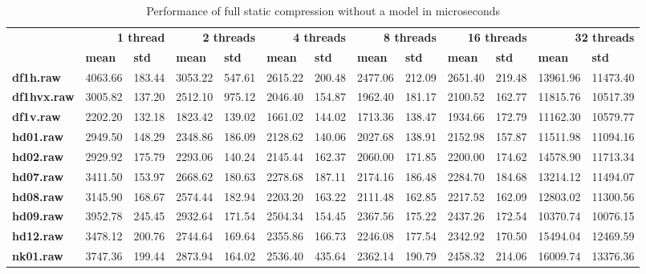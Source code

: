 \begin{table}[ht!]
\centering
\small
\begin{tabular}{l|ll|ll|ll|ll|ll|ll}
    & \multicolumn{2}{r|}{\textbf{1 thread}} & \multicolumn{2}{r|}{\textbf{2 threads}} & \multicolumn{2}{r|}{\textbf{4 threads}} & \multicolumn{2}{r|}{\textbf{8 threads}} & \multicolumn{2}{r|}{\textbf{16 threads}} & \multicolumn{2}{r}{\textbf{32 threads}} \\
    & \textbf{mean} & \textbf{std} & \textbf{mean} & \textbf{std} & \textbf{mean} & \textbf{std} & \textbf{mean} & \textbf{std} & \textbf{mean} & \textbf{std} & \textbf{mean} & \textbf{std} \\
\hline
    \textbf{df1h.raw} & 4063.66 & 183.44 & 3053.22 & 547.61 & 2615.22 & 200.48 & 2477.06 & 212.09 & 2651.40 & 219.48 & 13961.96 & 11473.40 \\
    \textbf{df1hvx.raw} & 3005.82 & 137.20 & 2512.10 & 975.12 & 2046.40 & 154.87 & 1962.40 & 181.17 & 2100.52 & 162.77 & 11815.76 & 10517.39 \\
    \textbf{df1v.raw} & 2202.20 & 132.18 & 1823.42 & 139.02 & 1661.02 & 144.02 & 1713.36 & 138.47 & 1934.66 & 172.79 & 11162.30 & 10579.77 \\
    \textbf{hd01.raw} & 2949.50 & 148.29 & 2348.86 & 186.09 & 2128.62 & 140.06 & 2027.68 & 138.91 & 2152.98 & 157.87 & 11511.98 & 11094.16 \\
    \textbf{hd02.raw} & 2929.92 & 175.79 & 2293.06 & 140.24 & 2145.44 & 162.37 & 2060.00 & 171.85 & 2200.00 & 174.62 & 14578.90 & 11713.34 \\
    \textbf{hd07.raw} & 3411.50 & 153.97 & 2668.62 & 180.63 & 2278.68 & 187.11 & 2174.16 & 186.48 & 2284.70 & 184.68 & 13214.12 & 11494.07 \\
    \textbf{hd08.raw} & 3145.90 & 168.67 & 2574.44 & 182.94 & 2203.20 & 163.22 & 2111.48 & 162.85 & 2217.52 & 162.09 & 12803.02 & 11300.56 \\
    \textbf{hd09.raw} & 3952.78 & 245.45 & 2932.64 & 171.54 & 2504.34 & 154.45 & 2367.56 & 175.22 & 2437.26 & 172.54 & 10370.74 & 10076.15 \\
    \textbf{hd12.raw} & 3478.12 & 200.76 & 2744.64 & 169.64 & 2355.86 & 166.73 & 2246.08 & 177.54 & 2342.92 & 170.50 & 15494.04 & 12469.59 \\
    \textbf{nk01.raw} & 3747.36 & 199.44 & 2873.94 & 164.02 & 2536.40 & 435.64 & 2362.14 & 190.79 & 2458.32 & 214.06 & 16009.74 & 13376.36 \\
\end{tabular}
\caption{Performance of full static compression without a model in microseconds}
\end{table}

